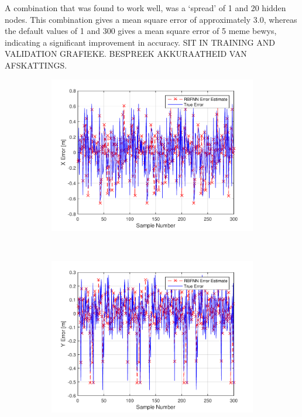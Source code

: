 A combination that was found to work well, was a `spread' of 1 and 20 hidden nodes. This combination gives a mean square error of approximately 3.0, whereas the default values of 1 and 300 gives a mean square error of 5 meme bewys, indicating a significant improvement in accuracy. SIT IN TRAINING AND VALIDATION GRAFIEKE. BESPREEK AKKURAATHEID VAN AFSKATTINGS.  

\begin{figure}
  \begin{subfigure}{0.3\textwidth}
    \includegraphics[width=\textwidth]{figures/chapter4/x_train}
    \caption{}
  \end{subfigure}
~
  \begin{subfigure}{0.3\textwidth}
    \includegraphics[width=\textwidth]{figures/chapter4/y_train}

\end{subfigure}
\end{figure}
